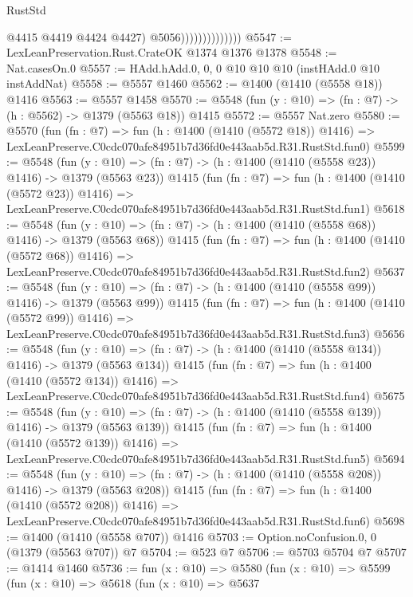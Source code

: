 \begin{lexlean}{RustStd}
\begin{coremodule}
                                  @4415
                                  @4419
                                  @4424
                                  @4427)
                                @5056))))))))))))))
@5547 := LexLeanPreservation.Rust.CrateOK @1374 @1376 @1378
@5548 := Nat.casesOn.{0}
@5557 := HAdd.hAdd.{0, 0, 0} @10 @10 @10 (instHAdd.{0} @10 instAddNat)
@5558 := @5557 @1460
@5562 := @1400 (@1410 (@5558 @18)) @1416
@5563 := @5557 @1458
@5570 := @5548 (fun (y : @10) => (fn : @7) -> (h : @5562) -> @1379 (@5563 @18)) @1415
@5572 := @5557 Nat.zero
@5580 := @5570
    (fun (fn : @7) =>
    fun (h : @1400 (@1410 (@5572 @18)) @1416) =>
    LexLeanPreserve.C0cdc070afe84951b7d36fd0e443aab5d.R31.RustStd.fun0)
@5599 := @5548
    (fun (y : @10) => (fn : @7) -> (h : @1400 (@1410 (@5558 @23)) @1416) -> @1379 (@5563 @23))
    @1415
    (fun (fn : @7) =>
    fun (h : @1400 (@1410 (@5572 @23)) @1416) =>
    LexLeanPreserve.C0cdc070afe84951b7d36fd0e443aab5d.R31.RustStd.fun1)
@5618 := @5548
    (fun (y : @10) => (fn : @7) -> (h : @1400 (@1410 (@5558 @68)) @1416) -> @1379 (@5563 @68))
    @1415
    (fun (fn : @7) =>
    fun (h : @1400 (@1410 (@5572 @68)) @1416) =>
    LexLeanPreserve.C0cdc070afe84951b7d36fd0e443aab5d.R31.RustStd.fun2)
@5637 := @5548
    (fun (y : @10) => (fn : @7) -> (h : @1400 (@1410 (@5558 @99)) @1416) -> @1379 (@5563 @99))
    @1415
    (fun (fn : @7) =>
    fun (h : @1400 (@1410 (@5572 @99)) @1416) =>
    LexLeanPreserve.C0cdc070afe84951b7d36fd0e443aab5d.R31.RustStd.fun3)
@5656 := @5548
    (fun (y : @10) => (fn : @7) -> (h : @1400 (@1410 (@5558 @134)) @1416) -> @1379 (@5563 @134))
    @1415
    (fun (fn : @7) =>
    fun (h : @1400 (@1410 (@5572 @134)) @1416) =>
    LexLeanPreserve.C0cdc070afe84951b7d36fd0e443aab5d.R31.RustStd.fun4)
@5675 := @5548
    (fun (y : @10) => (fn : @7) -> (h : @1400 (@1410 (@5558 @139)) @1416) -> @1379 (@5563 @139))
    @1415
    (fun (fn : @7) =>
    fun (h : @1400 (@1410 (@5572 @139)) @1416) =>
    LexLeanPreserve.C0cdc070afe84951b7d36fd0e443aab5d.R31.RustStd.fun5)
@5694 := @5548
    (fun (y : @10) => (fn : @7) -> (h : @1400 (@1410 (@5558 @208)) @1416) -> @1379 (@5563 @208))
    @1415
    (fun (fn : @7) =>
    fun (h : @1400 (@1410 (@5572 @208)) @1416) =>
    LexLeanPreserve.C0cdc070afe84951b7d36fd0e443aab5d.R31.RustStd.fun6)
@5698 := @1400 (@1410 (@5558 @707)) @1416
@5703 := Option.noConfusion.{0, 0} (@1379 (@5563 @707)) @7
@5704 := @523 @7
@5706 := @5703 @5704 @7
@5707 := @1414 @1460
@5736 := fun (x : @10) =>
  @5580
    (fun (x : @10) =>
    @5599
      (fun (x : @10) =>
      @5618
        (fun (x : @10) =>
        @5637

\end{coremodule}
\end{lexlean}
